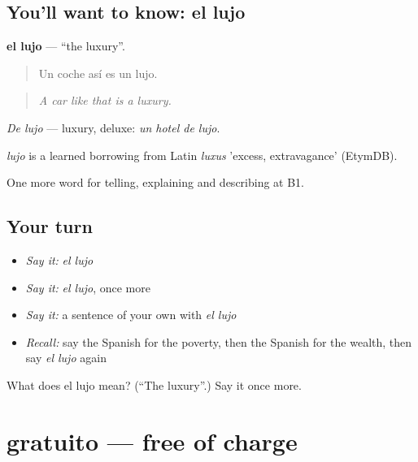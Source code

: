 \subsection*{You'll want to know: el lujo}
\textbf{el lujo} — \textquotedblleft{}the luxury\textquotedblright{}.

\begin{quote}
Un coche así es un lujo.
\end{quote}

\begin{quote}
\emph{A car like that is a luxury.}
\end{quote}

\emph{De lujo} — luxury, deluxe: \emph{un hotel de lujo}.

\begin{cousinweb}
\emph{lujo} is a learned borrowing from Latin \emph{luxus} 'excess, extravagance' (EtymDB).
\end{cousinweb}

\begin{grammarlens}[title={What you've built}]
One more word for telling, explaining and describing at B1.
\end{grammarlens}

\subsection*{Your turn}
\begin{itemize}
\raggedright
  \item \emph{Say it:} \emph{el lujo}
  \item \emph{Say it:} \emph{el lujo}, once more
  \item \emph{Say it:} a sentence of your own with \emph{el lujo}
  \item \emph{Recall:} say the Spanish for the poverty, then the Spanish for the wealth, then say \emph{el lujo} again
\end{itemize}

\begin{tcolorbox}[breakable,colback=teal!4,colframe=teal!35!black,title={Before you move on}]
What does el lujo mean? (\textquotedblleft{}The luxury\textquotedblright{}.) Say it once more.
\end{tcolorbox}
\section[gratuito]{gratuito — free of charge}

\label{lesson:ES-C633-gratuito}



